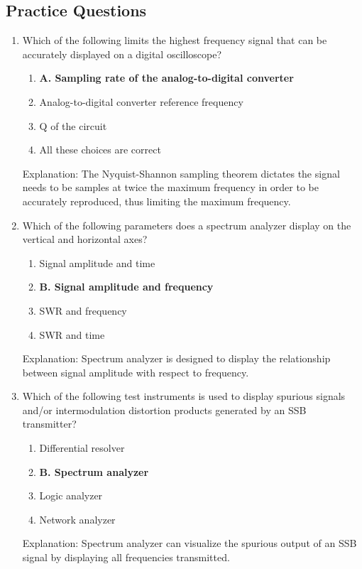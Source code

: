 \subsection*{Practice Questions}
\begin{enumerate}
   \item Which of the following limits the highest frequency signal that can be accurately displayed on a digital oscilloscope?
    \begin{enumerate}
    \item \textbf{A. Sampling rate of the analog-to-digital converter}
        \item  Analog-to-digital converter reference frequency
      \item  Q of the circuit
      \item  All these choices are correct
    \end{enumerate}
    \textcolor{myred}{Explanation:}
       The Nyquist-Shannon sampling theorem dictates the signal needs to be samples at twice the maximum frequency in order to be accurately reproduced, thus limiting the maximum frequency.
        
   \item Which of the following parameters does a spectrum analyzer display on the vertical and horizontal axes?
       \begin{enumerate}
         \item  Signal amplitude and time
    \item \textbf{B. Signal amplitude and frequency}
      \item  SWR and frequency
         \item  SWR and time
       \end{enumerate}
       \textcolor{myred}{Explanation:}
        Spectrum analyzer is designed to display the relationship between signal amplitude with respect to frequency.
    
    \item Which of the following test instruments is used to display spurious signals and/or intermodulation distortion products generated by an SSB transmitter?
        \begin{enumerate}
         \item  Differential resolver
      \item \textbf{B. Spectrum analyzer}
       \item  Logic analyzer
        \item  Network analyzer
      \end{enumerate}
    \textcolor{myred}{Explanation:}
      Spectrum analyzer can visualize the spurious output of an SSB signal by displaying all frequencies transmitted.
   

\end{enumerate}
